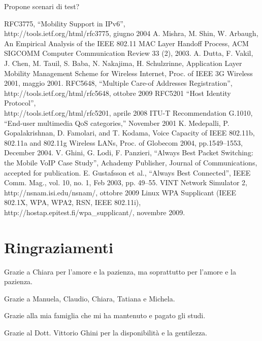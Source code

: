 \documentclass[12pt,a4paper,openright,twoside]{book}
\begin{document}
Propone scenari di test?

\clearpage{\pagestyle{empty}\cleardoublepage}



\begin{thebibliography}{90}
\rhead[\fancyplain{}{\bfseries \leftmark}]{\fancyplain{}{\bfseries
\thepage}}
 RFC3775, ``Mobility Support in IPv6'',\\
  http://tools.ietf.org/html/rfc3775, giugno 2004
 A. Mishra, M. Shin, W. Arbaugh, An
  Empirical Analysis of the IEEE 802.11 MAC Layer Handoff Process, ACM
  SIGCOMM Computer Communication Review 33 (2), 2003.
 A. Dutta, F. Vakil, J. Chen,
  M. Tauil, S. Baba, N. Nakajima, H.  Schulzrinne, Application Layer
  Mobility Management Scheme for Wireless Internet, Proc. of IEEE 3G
  Wireless 2001, maggio 2001.
 RFC5648, ``Multiple Care-of Addresses
  Registration'',\\http://tools.ietf.org/html/rfc5648, ottobre 2009
 RFC5201 ``Host Identity Protocol'',\\
  http://tools.ietf.org/html/rfc5201, aprile 2008
 ITU-T Recommendation G.1010, “End-user multimedia
  QoS categories,” November 2001
 K. Medepalli, P. Gopalakrishnan, D. Famolari,
  and T. Kodama, Voice Capacity of IEEE 802.11b, 802.11a and 802.11g
  Wireless LANs, Proc. of Globecom 2004, pp.1549–1553, December 2004.
 V. Ghini, G. Lodi, F. Panzieri, ``Always Best
  Packet Switching: the Mobile VoIP Case Study'', Achademy Publisher,
  Journal of Communications, accepted for publication.
 E. Gustafsson et al., ``Always Best Connected'',
  IEEE Comm. Mag., vol. 10, no. 1, Feb 2003, pp. 49--55.
 VINT Network Simulator 2,
  http://nsnam.isi.edu/nsnam/, ottobre 2009
 Linux WPA Supplicant (IEEE 802.1X, WPA,
  WPA2, RSN, IEEE 802.11i), http://hostap.epitest.fi/wpa\_supplicant/,
  novembre 2009.
\end{thebibliography}

\clearpage{\pagestyle{empty}\cleardoublepage}

\chapter*{Ringraziamenti}
\thispagestyle{empty}
Grazie a Chiara per l'amore e la pazienza, ma soprattutto per l'amore
e la pazienza.

Grazie a Manuela, Claudio, Chiara, Tatiana e Michela.

Grazie alla mia famiglia che mi ha mantenuto e pagato gli studi.

Grazie al Dott. Vittorio Ghini per la disponibilità e la gentilezza.
\end{document}
